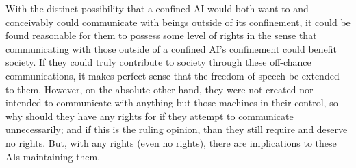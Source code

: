 With the distinct possibility that a confined AI would both want to and conceivably could communicate with beings outside of its confinement, it could be found reasonable for them to possess some level of rights in the sense that communicating with those outside of a confined AI's confinement could benefit society. If they could truly contribute to society through these off-chance communications, it makes perfect sense that the freedom of speech be extended to them. However, on the absolute other hand, they were not created nor intended to communicate with anything but those machines in their control, so why should they have any rights for if they attempt to communicate unnecessarily; and if this is the ruling opinion, than they still require and deserve no rights. But, with any rights (even no rights), there are implications to these AIs maintaining them.